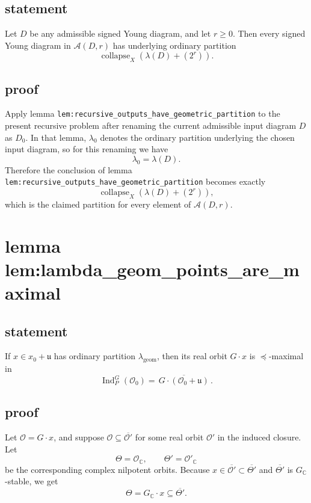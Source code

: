 \documentclass[
]{article}
\begin{document}
\subsection{statement}\label{statement-21}

Let \(D\) be any admissible signed Young diagram, and let \(r\ge 0\).
Then every signed Young diagram in \(\mathcal A(D,r)\) has underlying
ordinary partition \[
\operatorname{collapse}_X(\lambda(D)+(2^r)).
\]

\subsection{proof}\label{proof-21}

Apply lemma \texttt{lem:recursive\_outputs\_have\_geometric\_partition}
to the present recursive problem after renaming the current admissible
input diagram \(D\) as \(D_0\). In that lemma, \(\lambda_0\) denotes the
ordinary partition underlying the chosen input diagram, so for this
renaming we have \[
\lambda_0=\lambda(D).
\] Therefore the conclusion of lemma
\texttt{lem:recursive\_outputs\_have\_geometric\_partition} becomes
exactly \[
\operatorname{collapse}_X(\lambda(D)+(2^r)),
\] which is the claimed partition for every element of
\(\mathcal A(D,r)\).

\section{lemma
lem:lambda\_geom\_points\_are\_maximal}\label{lemma-lemlambda_geom_points_are_maximal}

\subsection{statement}\label{statement-22}

If \(x\in x_0+\mathfrak u\) has ordinary partition
\(\lambda_{\mathrm{geom}}\), then its real orbit \(G\cdot x\) is
\(\preceq\)-maximal in \[
\operatorname{Ind}_P^G(\mathcal O_0)=\overline{\,G\cdot(\mathcal O_0+\mathfrak u)\,}.
\]

\subsection{proof}\label{proof-22}

Let \(\mathcal O=G\cdot x\), and suppose
\(\mathcal O\subseteq \overline{\mathcal O'}\) for some real orbit
\(\mathcal O'\) in the induced closure. Let \[
\Theta=\mathcal O_{\mathbb C},\qquad \Theta'=\mathcal O'_{\mathbb C}
\] be the corresponding complex nilpotent orbits. Because
\(x\in \overline{\mathcal O'}\subset \overline{\Theta'}\) and
\(\overline{\Theta'}\) is \(G_{\mathbb C}\)-stable, we get \[
\Theta=G_{\mathbb C}\cdot x\subseteq \overline{\Theta'}.
\]
\end{document}
